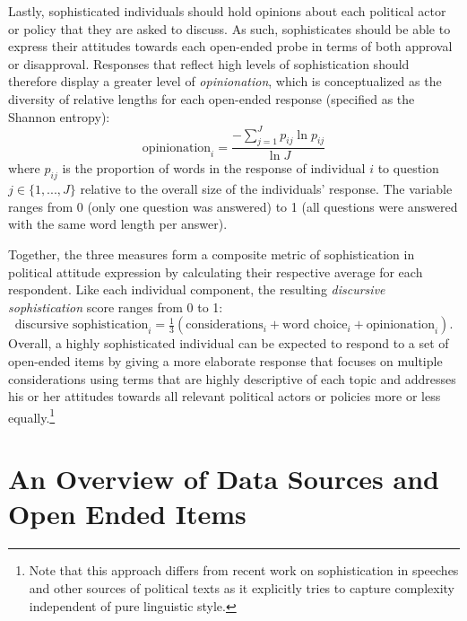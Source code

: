 Lastly, sophisticated individuals should hold opinions about each political actor or policy that they are asked to discuss. As such, sophisticates should be able to express their attitudes towards each open-ended probe in terms of both approval or disapproval. Responses that reflect high levels of sophistication should therefore display a greater level of \textit{opinionation}, which is conceptualized as the diversity of relative lengths for each open-ended response (specified as the Shannon entropy):
\begin{equation}
\text{opinionation}_i = \dfrac{-\sum_{j=1}^J p_{ij} \ln p_{ij}}{\ln J}
\end{equation}
where $p_{ij}$ is the proportion of words in the response of individual $i$ to question $j\in \{1,...,J\}$ relative to the overall size of the individuals' response. The variable ranges from 0 (only one question was answered) to 1 (all questions were answered with the same word length per answer).

Together, the three measures form a composite metric of sophistication in political attitude expression by calculating their respective average for each respondent. Like each individual component, the resulting \textit{discursive sophistication} score ranges from 0 to 1:
\begin{equation}
\text{discursive sophistication}_i = \tfrac{1}{3}(\text{considerations}_i + \text{word choice}_i + \text{opinionation}_i).
\end{equation}
Overall, a highly sophisticated individual can be expected to respond to a set of open-ended items by giving a more elaborate response that focuses on multiple considerations using terms that are highly descriptive of each topic and addresses his or her attitudes towards all relevant political actors or policies more or less equally.\footnote{Note that this approach differs from recent work on sophistication in speeches and other sources of political texts \citep[e.g.,][]{spirling2016democratization,benoit2017measuring} as it explicitly tries to capture complexity independent of pure linguistic style.}


\section{An Overview of Data Sources and Open Ended Items}

